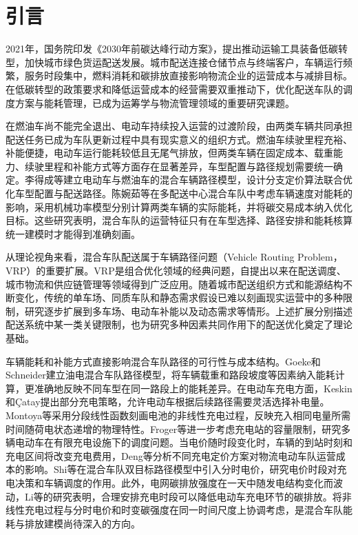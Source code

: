 \documentclass{setp-new}
\begin{document}
\maketitle

\section{引言}

2021年，国务院印发《2030年前碳达峰行动方案》，提出推动运输工具装备低碳转型，加快城市绿色货运配送发展\cite{ref:55}。城市配送连接仓储节点与终端客户，车辆运行频繁，服务时段集中，燃料消耗和碳排放直接影响物流企业的运营成本与减排目标。在低碳转型的政策要求和降低运营成本的经营需要双重推动下，优化配送车队的调度方案与能耗管理，已成为运筹学与物流管理领域的重要研究课题。

在燃油车尚不能完全退出、电动车持续投入运营的过渡阶段，由两类车辆共同承担配送任务已成为车队更新过程中具有现实意义的组织方式。燃油车续驶里程充裕、补能便捷，电动车运行能耗较低且无尾气排放，但两类车辆在固定成本、载重能力、续驶里程和补能方式等方面存在显著差异，车型配置与路径规划需要统一确定。李得成等\cite{ref:6}建立电动车与燃油车的混合车辆路径模型，设计分支定价算法联合优化车型配置与配送路径。陈婉茹等\cite{ref:23}在多配送中心混合车队中考虑车辆速度对能耗的影响，采用机械功率模型分别计算两类车辆的实际能耗，并将碳交易成本纳入优化目标。这些研究表明，混合车队的运营特征只有在车型选择、路径安排和能耗核算统一建模时才能得到准确刻画。

从理论视角来看，混合车队配送属于车辆路径问题（Vehicle Routing Problem，VRP）的重要扩展。VRP是组合优化领域的经典问题，自提出以来在配送调度、城市物流和供应链管理等领域得到广泛应用。随着城市配送组织方式和能源结构不断变化，传统的单车场、同质车队和静态需求假设已难以刻画现实运营中的多种限制，研究逐步扩展到多车场、电动车补能以及动态需求等情形。上述扩展分别描述配送系统中某一类关键限制，也为研究多种因素共同作用下的配送优化奠定了理论基础。

车辆能耗和补能方式直接影响混合车队路径的可行性与成本结构。Goeke和Schneider\cite{ref:27}建立油电混合车队路径模型，将车辆载重和路段坡度等因素纳入能耗计算，更准确地反映不同车型在同一路段上的能耗差异。在电动车充电方面，Keskin和Çatay\cite{ref:45}提出部分充电策略，允许电动车根据后续路径需要灵活选择补电量。Montoya等\cite{ref:montoya}采用分段线性函数刻画电池的非线性充电过程，反映充入相同电量所需时间随荷电状态递增的物理特性。Froger等\cite{ref:12}进一步考虑充电站的容量限制，研究多辆电动车在有限充电设施下的调度问题。当电价随时段变化时，车辆的到站时刻和充电区间将改变充电费用，Deng等\cite{ref:deng}分析不同充电定价方案对物流电动车队运营成本的影响。Shi等\cite{ref:93}在混合车队双目标路径模型中引入分时电价，研究电价时段对充电决策和车辆调度的作用。此外，电网碳排放强度在一天中随发电结构变化而波动，Li等\cite{ref:52}的研究表明，合理安排充电时段可以降低电动车充电环节的碳排放。将非线性充电过程与分时电价和时变碳强度在同一时间尺度上协调考虑，是混合车队能耗与排放建模尚待深入的方向。
\end{document}
